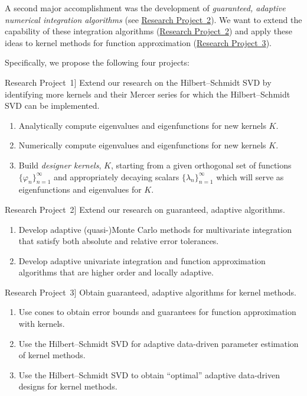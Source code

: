 \documentclass[11pt]{NSFamsart}
\newcommand{\refproba}{\hyperref[SectHSSVD]{Research Project~1}\xspace}
\newcommand{\refprobb}{\hyperref[SectGAIL]{Research Project~2}\xspace}
\newcommand{\refprobc}{\hyperref[combinesec]{Research Project~3}\xspace}
\begin{document}
A second major accomplishment was the development of \emph{guaranteed, adaptive numerical integration algorithms} \citep{HicEtal14b,HicEtal14a,HicJim16a,JimHic16a} (see \refprobb).  We want to extend the capability of these integration algorithms  (\refprobb) and apply these ideas to kernel methods for function approximation (\refprobc).

Specifically, we propose the following four projects:

\begin{description}[leftmargin=2.5ex]

\item[\refproba] Extend our research on the Hilbert--Schmidt SVD by identifying more kernels and their Mercer series for which the Hilbert--Schmidt SVD can be implemented.
\begin{enumerate}
\renewcommand{\labelenumi}{1.\arabic{enumi}.}
\item Analytically compute eigenvalues and eigenfunctions for new kernels $K$.
\item Numerically compute eigenvalues and eigenfunctions for new kernels $K$.
\item Build \emph{designer kernels}, $K$, starting from a given orthogonal set of functions $\{\varphi_n\}_{n=1}^\infty$ and appropriately decaying scalars $\{\lambda_n\}_{n=1}^\infty$ which will serve as eigenfunctions and eigenvalues for $K$.
\end{enumerate}

\item[\refprobb] Extend our research on guaranteed, adaptive algorithms.
\begin{enumerate}
\renewcommand{\labelenumi}{2.\arabic{enumi}.}
\item Develop adaptive (quasi-)Monte Carlo methods for multivariate integration that satisfy both absolute and relative error tolerances.
\item Develop adaptive univariate integration and function approximation algorithms that are higher order and locally adaptive.
\end{enumerate}

\item[\refprobc] Obtain guaranteed, adaptive algorithms for kernel methods.
\begin{enumerate}
\renewcommand{\labelenumi}{3.\arabic{enumi}.}
\item Use cones to obtain error bounds and guarantees for function approximation with kernels.
\item Use the Hilbert--Schmidt SVD for adaptive data-driven parameter estimation of kernel methods.
\item Use the Hilbert--Schmidt SVD to obtain ``optimal'' adaptive data-driven designs for kernel methods.
\end{enumerate}


\end{description}
\end{document}
